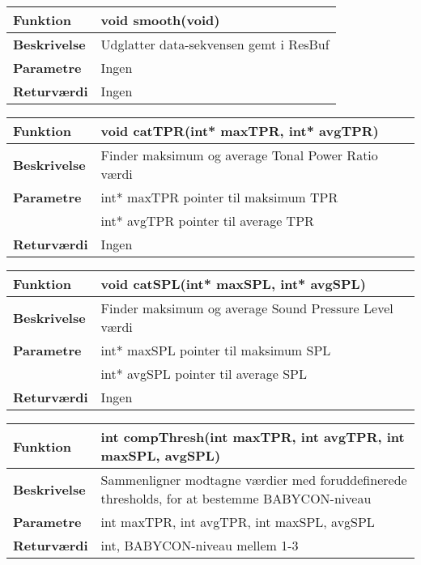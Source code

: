 \begin{center}
    \begin{tabular}{ | l | p{10cm} |}
    \hline
    \textbf{Funktion}	 	& void smooth(void)										\\ \hline
    \textbf{Beskrivelse} 	& Udglatter data-sekvensen gemt i ResBuf				\\ \hline
    \textbf{Parametre}		& Ingen							 					    \\ \hline
    \textbf{Returværdi} 	& Ingen													\\ \hline
    \end{tabular}
\end{center}

\begin{center}
    \begin{tabular}{ | l | p{10cm} |}
    \hline
    \textbf{Funktion}	 	& void catTPR(int* maxTPR, int* avgTPR)										\\ \hline
    \textbf{Beskrivelse} 	& Finder maksimum og average Tonal Power Ratio værdi				\\ \hline
    \textbf{Parametre}		& int* maxTPR pointer til maksimum TPR\\&
    						  int* avgTPR pointer til average TPR						    \\ \hline
    \textbf{Returværdi} 	& Ingen													\\ \hline
    \end{tabular}
\end{center}

\begin{center}
    \begin{tabular}{ | l | p{10cm} |}
    \hline
    \textbf{Funktion}	 	& void catSPL(int* maxSPL, int* avgSPL)								\\ \hline
    \textbf{Beskrivelse} 	& Finder maksimum og average Sound Pressure Level værdi				\\ \hline
    \textbf{Parametre}		& int* maxSPL pointer til maksimum SPL\\&
    						  int* avgSPL pointer til average SPL						 		\\ \hline
    \textbf{Returværdi} 	& Ingen																\\ \hline
    \end{tabular}
\end{center}

\begin{center}
    \begin{tabular}{ | l | p{10cm} |}
    \hline
    \textbf{Funktion}	 	& int compThresh(int maxTPR, int avgTPR, int maxSPL, avgSPL)										\\ \hline
    \textbf{Beskrivelse} 	& Sammenligner modtagne værdier med foruddefinerede thresholds, for at bestemme BABYCON-niveau				\\ \hline
    \textbf{Parametre}		& int maxTPR, int avgTPR, int maxSPL, avgSPL						 					    \\ \hline
    \textbf{Returværdi} 	& int, BABYCON-niveau mellem 1-3													\\ \hline
    \end{tabular}
\end{center}

